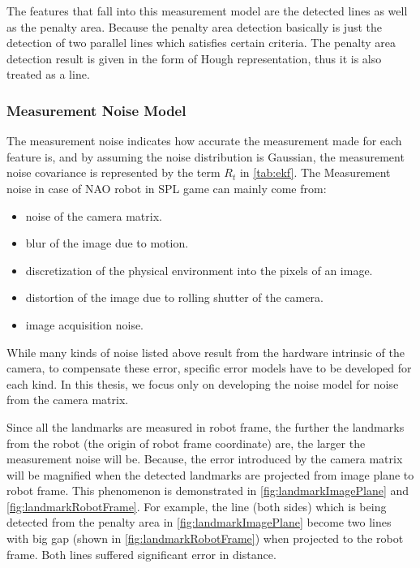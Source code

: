 The features that fall into this measurement model are the detected lines as well as the penalty area. Because the penalty area detection basically is just the detection of two parallel lines which satisfies certain criteria. The penalty area detection result is given in the form of Hough representation, thus it is also treated as a line.

\subsubsection{Measurement Noise Model}
\label{sub:Measurement Noise Model}
The measurement noise indicates how accurate the measurement made for each feature is, and by assuming the noise distribution is Gaussian, the measurement noise covariance is represented by the term $R_{t}$ in \autoref{tab:ekf}. The Measurement noise in case of NAO robot in \gls{SPL} game can mainly come from:
\begin{itemize}
  \item noise of the camera matrix.
  \item blur of the image due to motion.
  \item discretization of the physical environment into the pixels of an image.
  \item distortion of the image due to rolling shutter of the camera.
  \item image acquisition noise.
\end{itemize}
While many kinds of noise listed above result from the hardware intrinsic of the camera, to compensate these error, specific error models have to be developed for each kind. In this thesis, we focus only on developing the noise model for noise from the camera matrix.

Since all the landmarks are measured in robot frame, the further the landmarks from the robot (the origin of robot frame coordinate) are, the larger the measurement noise will be. Because, the error introduced by the camera matrix will be magnified when the detected landmarks are projected from image plane to robot frame. This phenomenon is demonstrated in \autoref{fig:landmarkImagePlane} and \autoref{fig:landmarkRobotFrame}. For example, the line (both sides) which is being detected from the penalty area in \autoref{fig:landmarkImagePlane} become two lines with big gap (shown in \autoref{fig:landmarkRobotFrame}) when projected to the robot frame. Both lines suffered significant error in distance.\\

